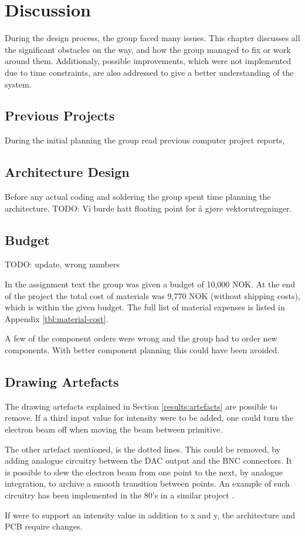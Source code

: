 \chapter{Discussion}

During the design process, the group faced many issues. This chapter discusses all the significant obstacles on the way, and how the group managed to fix or work around them. Additionaly, possible improvements, which were not implemented due to time constraints, are also addressed to give a better understanding of the system.

\section{Previous Projects}
During the initial planning the group read previous computer project reports,


\section{Architecture Design}
Before any actual coding and soldering the group spent time planning the architecture.
TODO: Vi burde hatt floating point for å gjøre vektorutregninger.

\section{Budget}
TODO: update, wrong numbers

In the assignment text the group was given a budget of 10,000 NOK.
At the end of the project the total cost of materials was 9,770 NOK (without shipping costs), which is within the given budget.
The full list of material expenses is listed in Appendix \ref{tbl:material-cost}.

A few of the component orders were wrong and the group had to order new components.
With better component planning this could have been avoided.



\section{Drawing Artefacts}
\label{discussion:artefacts}
The drawing artefacts explained in Section \ref{results:artefacts} are possible to remove.
If a third input value for intensity were to be added, one could turn the electron beam off when moving the beam between primitive.

The other artefact mentioned, is the dotted lines.
This could be removed, by adding analogue circuitry between the DAC output and the BNC connectors.
It is possible to slew the electron beam from one point to the next, by analogue integration, to archive a smooth transition between points.
An example of such circuitry has been implemented in the 80's in a similar project \cite{vector-graphic-crt}.


If \vthreek were to support an intensity value in addition to x and y, the architecture and PCB require changes.
